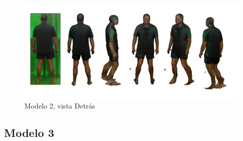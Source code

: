 \begin{figure}[H]
	\centering
	\includegraphics[scale=0.65]{imagenes/andres4.png}
	\caption{Modelo 2, vista Detrás}
	\label{fig:a4}
\end{figure}
\subsection{Modelo 3}

